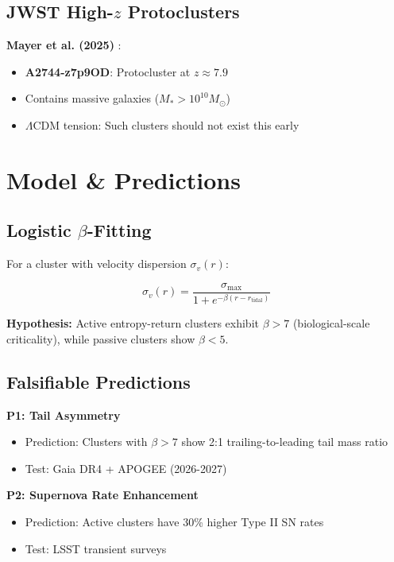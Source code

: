 \documentclass[11pt,a4paper,twocolumn]{article}
\begin{document}
\subsection{JWST High-$z$ Protoclusters}

\textbf{Mayer et al. (2025)} \citep{mayer2025}:
\begin{itemize}
    \item \textbf{A2744-z7p9OD}: Protocluster at $z \approx 7.9$
    \item Contains massive galaxies ($M_* > 10^{10} M_\odot$)
    \item $\Lambda$CDM tension: Such clusters should not exist this early
\end{itemize}

\section{Model \& Predictions}

\subsection{Logistic $\beta$-Fitting}

For a cluster with velocity dispersion $\sigma_v(r)$:

\begin{equation}
\sigma_v(r) = \frac{\sigma_{\max}}{1 + e^{-\beta(r - r_{\text{tidal}})}}
\end{equation}

\textbf{Hypothesis:} Active entropy-return clusters exhibit $\beta > 7$ (biological-scale criticality), while passive clusters show $\beta < 5$.

\subsection{Falsifiable Predictions}

\textbf{P1: Tail Asymmetry}
\begin{itemize}
    \item Prediction: Clusters with $\beta > 7$ show 2:1 trailing-to-leading tail mass ratio
    \item Test: Gaia DR4 + APOGEE (2026-2027)
\end{itemize}

\textbf{P2: Supernova Rate Enhancement}
\begin{itemize}
    \item Prediction: Active clusters have 30\% higher Type II SN rates
    \item Test: LSST transient surveys
\end{itemize}
\end{document}
